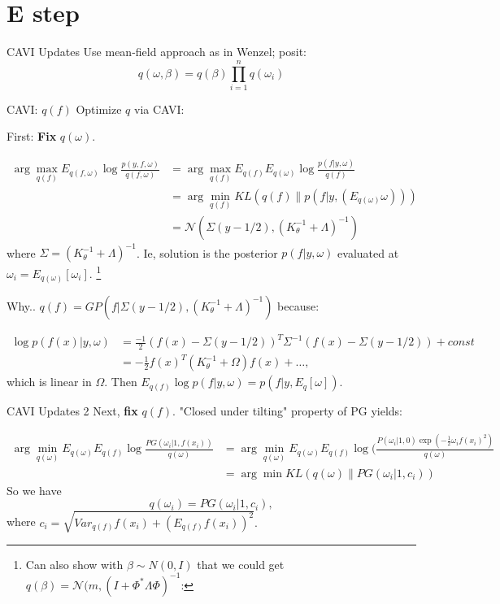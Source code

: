 \documentclass[aspectratio=169,xcolor=dvipsnames]{beamer}
\begin{document}
\section{E step}
\begin{frame}{CAVI Updates}
    Use mean-field approach as in Wenzel; posit: $$q(\omega, \beta) = q(\beta) \prod_{i=1}^n q(\omega_i)$$
    \end{frame}
    \begin{frame}{CAVI: $q(f)$}
    Optimize $q$ via CAVI: \vspace{0.5cm}
    
    First: \textbf{Fix} $q(\omega)$. 

        \begin{align}
        \arg \max_{q(f)} E_{q(f,\omega)} \log \frac{p(y,f,\omega)}{q(f, \omega)}&= \arg \max_{q(f)} E_{q(f)} E_{q(\omega)} \log \frac{p(f| y, \omega)}{q(f)} \\&= \arg \min_{q(f)} KL(q(f) \| p(f|y,(E_{q(\omega)} \omega)) )\\
        & = \mathcal N(\Sigma (y-1/2), (K_\theta^{-1} + \Lambda)^{-1})
        \end{align}
        where $\Sigma = (K_\theta^{-1} + \Lambda)^{-1}$. Ie, solution is the posterior $p(f| y, \omega)$ evaluated at $\omega_i = E_{q(\omega)} [\omega_i]  $. 
        \footnote{Can also show with $\beta\sim N(0,I)$ that we could get $q(\beta) = \mathcal N(m, (I + \Phi^*\Lambda\Phi)^{-1}$: }

\end{frame}
\begin{frame}{Why..}
    $q(f) = GP\left(f|\Sigma(y-1/2), (K_\theta^{-1} + \Lambda )^{-1}\right)$ because:

        \begin{align}\log p(f(x)|y,\omega) &= \frac{-1}{2} (f(x) - \Sigma (y-1/2))^T \Sigma^{-1} (f(x) - \Sigma(y-1/2)) + const \\&= -\frac{1}{2}f(x)^T (K_\theta^{-1} + \Omega ) f(x) + \ldots,
        \end{align}
        which is linear in $\Omega$. Then $E_{q(f)} \log p(f|y,\omega) =p(f|y,E_q[\omega])$. 
\end{frame}
\begin{frame}{CAVI Updates 2}
     Next, \textbf{fix} $q(f)$. "Closed under tilting" property of PG yields:



\begin{align}
    \arg \min _{q(\omega)} E_{q(\omega)} E_{q(f)} \log \frac{PG(\omega_i | 1, f(x_i))}{q(\omega)} &= \arg \min_{q(\omega)} E_{q(\omega)} E_{q(f)} \log (\frac{P(\omega_i| 1,0)\exp(-\frac{1}{2} \omega_i f(x_i)^2)}{q(\omega)} \\&= \arg \min KL(q(\omega) \| PG(\omega_i | 1,c_i) )
\end{align}
So we have
    $$q(\omega_i) = PG(\omega_i| 1,c_i),$$
    where $c_i  = \sqrt{Var_{q(f)} f(x_i) + \left(E_{q(f)} f(x_i)\right)^2}.$


\end{frame}
\end{document}
